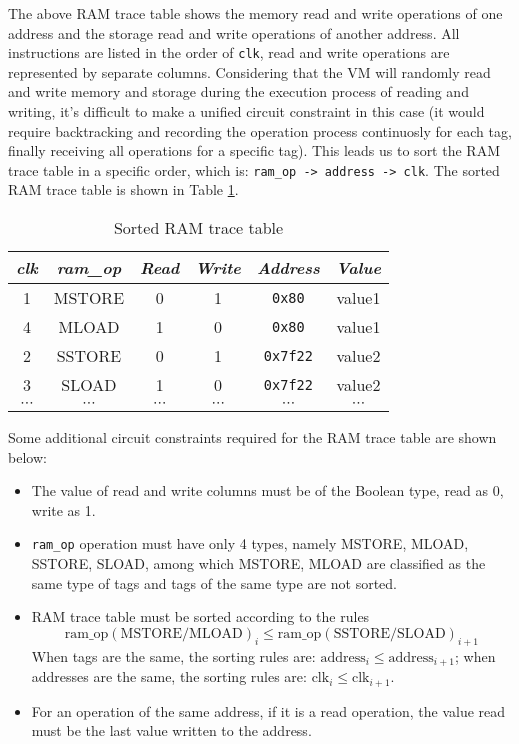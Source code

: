 The above RAM trace table shows the memory read and write operations of one address and the storage read and write operations of another address. All instructions are listed in the order of \verb|clk|, read and write operations are represented by separate columns. Considering that the VM will randomly read and write memory and storage during the execution process of reading and writing, it's difficult to make a unified circuit constraint in this case (it would require backtracking and recording the operation process continuosly for each tag, finally receiving all operations for a specific tag). This leads us to sort the RAM trace table in a specific order, which is: \verb|ram_op -> address -> clk|. The sorted RAM trace table is shown in Table \ref{table:sorted-ram-trace-table}.
\begin{table}[!ht]
    \centering
    \begin{tabular}{|c|c|c|c|c|c|}
    \hline
    \emph{clk} & \emph{ram\_op} & \emph{Read} & \emph{Write} & \emph{Address} & \emph{Value} \\ \hline
    1 & MSTORE & 0 & 1 & \texttt{0x80} & value1 \\
    4 & MLOAD & 1 & 0 & \texttt{0x80} & value1 \\
    2 & SSTORE & 0 & 1 & \texttt{0x7f22} & value2 \\
    3 & SLOAD & 1 & 0 & \texttt{0x7f22} & value2 \\
    $\cdots$ & $\cdots$ & $\cdots$ & $\cdots$ & $\cdots$ & $\cdots$ \\ \hline
    \end{tabular}
    \caption{Sorted RAM trace table}
    \label{table:sorted-ram-trace-table}
\end{table}

Some additional circuit constraints required for the RAM trace table are shown below:
\begin{itemize}
    \item The value of read and write columns must be of the Boolean type, read as 0, write as 1.
    \item \verb|ram_op| operation must have only 4 types, namely MSTORE, MLOAD, SSTORE, SLOAD, among which MSTORE, MLOAD are classified as the same type of tags and tags of the same type are not sorted.
    \item RAM trace table must be sorted according to the rules \[ \text{ram\_op}(\text{MSTORE/MLOAD})_{i} \le \text{ram\_op}(\text{SSTORE/SLOAD})_{i+1}\] When tags are the same, the sorting rules are: $\text{address}_{i} \le \text{address}_{i+1}$; when addresses are the same, the sorting rules are: $\text{clk}_{i} \le \text{clk}_{i+1}$.
    \item For an operation of the same address, if it is a read operation, the value read must be the last value written to the address.
\end{itemize}
